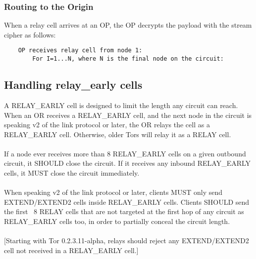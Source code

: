 \subsubsection{Routing to the Origin}
When a relay cell arrives at an OP, the OP decrypts the payload
with the stream cipher as follows:
\begin{verbatim}
    OP receives relay cell from node 1:
        For I=1...N, where N is the final node on the circuit:
\end{verbatim}

\subsection{Handling relay\_early cells}
A RELAY\_EARLY cell is designed to limit the length any circuit can reach.
When an OR receives a RELAY\_EARLY cell, and the next node in the circuit
is speaking v2 of the link protocol or later, the OR relays the cell as a
RELAY\_EARLY cell. Otherwise, older Tors will relay it as a RELAY cell.

\paragraph{}
If a node ever receives more than 8 RELAY\_EARLY cells on a given
outbound circuit, it SHOULD close the circuit. If it receives any
inbound RELAY\_EARLY cells, it MUST close the circuit immediately.

\paragraph{}
When speaking v2 of the link protocol or later, clients MUST only send
EXTEND/EXTEND2 cells inside RELAY\_EARLY cells. Clients SHOULD send the first ~8
RELAY cells that are not targeted at the first hop of any circuit as
RELAY\_EARLY cells too, in order to partially conceal the circuit length.

\paragraph{}
[Starting with Tor 0.2.3.11-alpha, relays should reject any
EXTEND/EXTEND2 cell not received in a RELAY\_EARLY cell.]